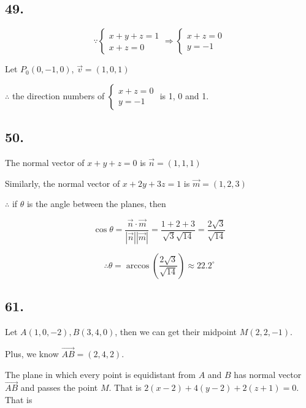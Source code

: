 \documentclass{article}
\begin{document}
    \subsection*{49.}

    $$\because \left\{ \begin{array}{ll} x + y + z = 1 \\ x + z = 0 \end{array}\right. \Rightarrow \left\{ \begin{array}{ll} x+z=0 \\ y=-1 \end{array}\right.$$

    Let $P_0(0, -1, 0)$, $\overrightarrow{v} = (1, 0, 1)$

    $\therefore $ the direction numbers of $\left\{ \begin{array}{ll} x+z=0 \\ y=-1 \end{array}\right.$ is 1, 0 and 1.

    \subsection*{50.}

    The normal vector of $x+y+z=0$ is $\overrightarrow{n} = (1, 1, 1)$

    Similarly, the normal vector of $x+2y+3z=1$ is $\overrightarrow{m} = (1, 2, 3)$

    $\therefore $ if $\theta$ is the angle between the planes, then
    
    $$\cos \theta = \frac{\overrightarrow{n} \cdot \overrightarrow{m}}{|\overrightarrow{n}| |\overrightarrow{m}|} = \frac{1 + 2 + 3}{\sqrt{3}\sqrt{14}} = \frac{2\sqrt 3}{\sqrt{14}}$$

    $$\therefore \theta = \arccos(\frac{2\sqrt 3}{\sqrt{14}}) \approx 22.2^\circ$$

    \subsection*{61.}

    Let $A(1, 0, -2), B(3, 4, 0)$, then we can get their midpoint $M(2, 2, -1)$.

    Plus, we know $\overrightarrow{AB} = (2, 4, 2)$.

    The plane in which every point is equidistant from $A$ and $B$ has normal vector $\overrightarrow{AB}$ and passes the point $M$. That is $2(x-2) + 4(y-2) + 2(z+1) = 0$. That is
\end{document}
